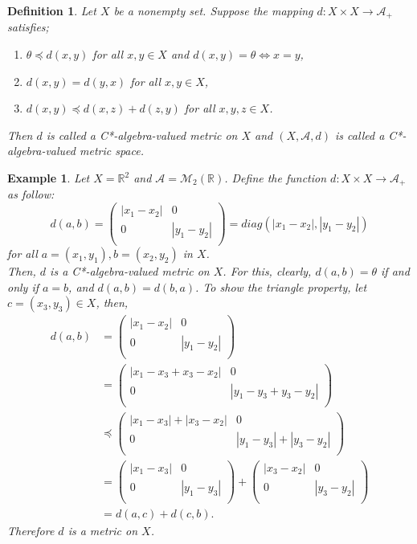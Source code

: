 \documentclass{amsart}%
\theoremstyle{plain}
\newtheorem{definition}{Definition}
\newtheorem{example}{Example}
\numberwithin{equation}{section}
\begin{document}
\begin{definition}
	\cite{Z.H.Ma} Let $X$ be a nonempty set. Suppose the mapping $d:X\times X\longrightarrow \mathcal{A}_+$ satisfies;
	\begin{enumerate}
		\item $\theta\preceq d(x,y)$ for all $x,y\in X$ and $d(x,y)=\theta \Leftrightarrow x=y$,
		\item $d(x,y)=d(y,x)$ for all $ x,y\in X$,
		\item $d(x,y)\preceq d(x,z)+d(z,y)$ for all $x,y,z\in X$.
	\end{enumerate}   		
	Then $d$ is called a C*-algebra-valued metric on $X$ and $(X,\mathcal{A},d)$ is called a C*-algebra-valued metric space.
\end{definition}   
\begin{example}\label{Ex1}
	Let $X=\mathbb{R}^2$ and $\mathcal{A}=\mathcal{M}_2(\mathbb{R})$. Define the function $d: X\times X \to \mathcal{A}_+$ as follow: 
	$$d\left(a, b\right)= 
	\left(
	\begin{array}{cc}
		|x_1-x_2| & 0  \\
		0 & |y_1-y_2|  \\
	\end{array}
	\right)= diag\left(|x_1-x_2|, |y_1-y_2| \right) 
	$$
	for all $a=(x_1,y_1), b=(x_2,y_2)$ in $X$.\\
	Then, $d$ is a C*-algebra-valued metric on $X$. For this,
	clearly, $d(a,b)=\theta$ if and only if $a=b$, and $d(a,b)=d(b,a)$. To show the triangle property, let $c=(x_3, y_3) \in X$, then,
	\begin{align*}
		d(a,b)&=\left(
		\begin{array}{cc}
			|x_1-x_2| & 0  \\
			0 & |y_1-y_2|  \\
		\end{array}
		\right)\\
		&=\left(
		\begin{array}{cc}
			|x_1-x_3+x_3-x_2| & 0  \\
			0 & |y_1-y_3+y_3-y_2|  \\
		\end{array}
		\right)\\
		&\preceq \left(
		\begin{array}{cc}
			|x_1-x_3|+|x_3-x_2| & 0  \\
			0 & |y_1-y_3|+|y_3-y_2|  \\
		\end{array}
		\right)\\
		&=\left(
		\begin{array}{cc}
			|x_1-x_3| & 0  \\
			0 & |y_1-y_3|  \\
		\end{array}
		\right)+\left(
		\begin{array}{cc}
			|x_3-x_2| & 0  \\
			0 & |y_3-y_2|  \\
		\end{array}
		\right)\\
		&=d(a,c)+d(c,b).
	\end{align*}
	Therefore $d$ is a metric on $X$.
\end{example}
\end{document}
